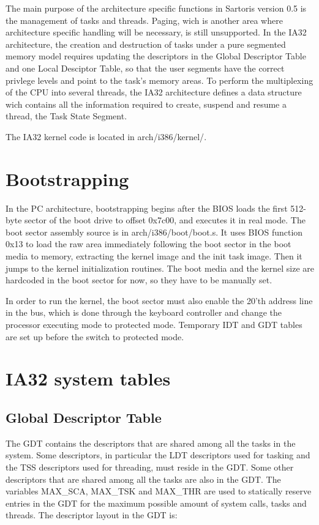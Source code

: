\documentclass[11pt, letterpaper, twoside, english]{book}
\begin{document}
The main purpose of the architecture specific functions in Sartoris version 0.5 is the management of tasks and threads. Paging, wich is another area where architecture specific handling will be necessary, is still unsupported. In the IA32 architecture, the creation and destruction of tasks under a pure segmented memory model requires updating the descriptors in the Global Descriptor Table and one Local Desciptor Table, so that the user segments have the correct privlege levels and point to the task's memory areas. To perform the multiplexing of the CPU into several threads, the IA32 architecture defines a data structure wich contains all the information required to create, suspend and resume a thread, the Task State Segment.

The IA32 kernel code is located in \textsf{arch/i386/kernel/}.

\section{Bootstrapping}

In the PC architecture, bootstrapping begins after the BIOS loads the first 512-byte sector of the boot drive to offset 0x7c00, and executes it in real mode. The boot sector assembly source is in \textsf{arch/i386/boot/boot.s}. It uses BIOS function 0x13 to load the raw area immediately following the boot sector in the boot media to memory, extracting the kernel image and the init task image. Then it jumps to the kernel initialization routines. The boot media and the kernel size are hardcoded in the boot sector for now, so they have to be manually set.

In order to run the kernel, the boot sector must also enable the 20'th address line in the bus, which is done through the keyboard controller and change the processor executing mode to protected mode. Temporary IDT and GDT tables are set up before the switch to protected mode.

\section{IA32 system tables}

\subsection{Global Descriptor Table}  \label{subsec:GDT}

The GDT contains the descriptors that are shared among all the tasks in the system. Some descriptors, in particular the LDT descriptors used for tasking and the TSS descriptors used for threading, must reside in the GDT. Some other descriptors that are shared among all the tasks are also in the GDT. The variables \textsf{MAX\_SCA}, \textsf{MAX\_TSK} and \textsf{MAX\_THR} are used to statically reserve entries in the GDT for the maximum possible amount of system calls, tasks and threads. The descriptor layout in the GDT is: \\
\\
\end{document}
